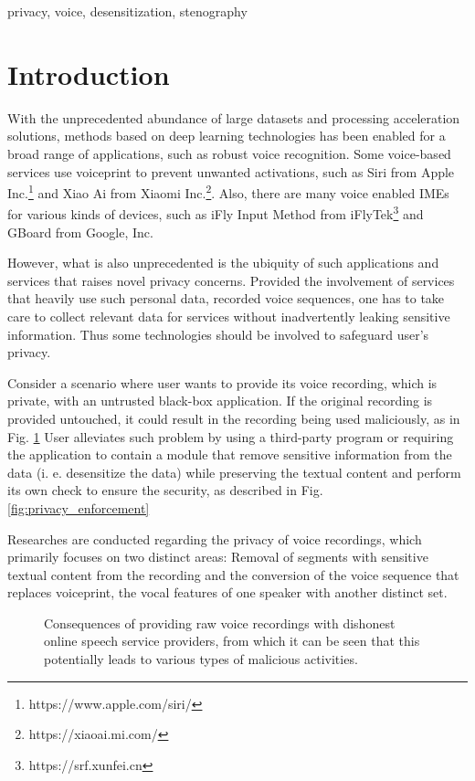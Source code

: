 \documentclass[conference]{IEEEtran}
\begin{document}
\begin{IEEEkeywords}
    privacy, voice, desensitization, stenography
\end{IEEEkeywords}

\section{Introduction}
\label{seg:intro}

With the unprecedented abundance of large datasets and processing acceleration solutions, methods based on deep learning technologies has been enabled for a broad range of applications, such as robust voice recognition\cite{spkr_recg}. Some voice-based services use voiceprint to prevent unwanted activations, such as Siri from Apple Inc.\footnote{https://www.apple.com/siri/} and Xiao Ai from Xiaomi Inc.\footnote{https://xiaoai.mi.com/}. Also, there are many voice enabled IMEs for various kinds of devices, such as iFly Input Method from iFlyTek\footnote{https://srf.xunfei.cn} and GBoard from Google, Inc.

However, what is also unprecedented is the ubiquity of such applications and services that raises novel privacy concerns. Provided the involvement of services that heavily use such personal data, recorded voice sequences, one has to take care to collect relevant data for services without inadvertently leaking sensitive information. Thus some technologies should be involved to safeguard user's privacy.

Consider a scenario where user wants to provide its voice recording, which is private, with an untrusted black-box application. If the original recording is provided untouched, it could result in the recording being used maliciously, as in Fig. \ref{fig:dishonest_provider} User alleviates such problem by using a third-party program or requiring the application to contain a module that remove sensitive information from the data (i. e. desensitize the data) while preserving the textual content and perform its own check to ensure the security, as described in Fig. \ref{fig:privacy_enforcement}

Researches are conducted regarding the privacy of voice recordings, which primarily focuses on two distinct areas: Removal of segments with sensitive textual content from the recording and the conversion of the voice sequence that replaces voiceprint, the vocal features of one speaker with another distinct set.

\begin{figure}[!t]
    \caption{Consequences of providing raw voice recordings with dishonest online speech service providers, from which it can be seen that this potentially leads to various types of malicious activities.}
    \label{fig:dishonest_provider}
\end{figure}
\end{document}
